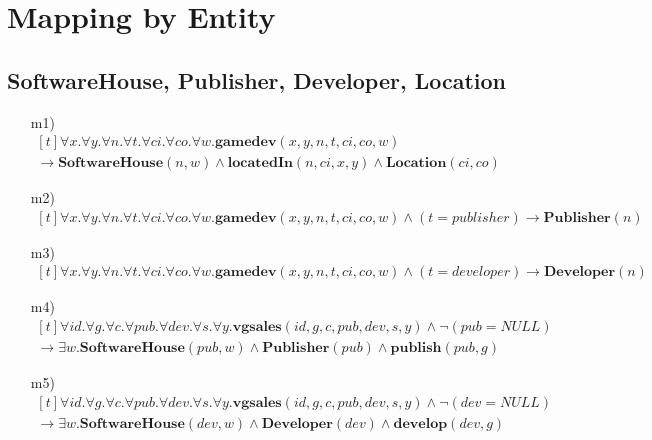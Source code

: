 \section*{Mapping by Entity}

\subsection*{SoftwareHouse, Publisher, Developer, Location}
\begin{itemize}
	\item[m1)] 
	$ \begin{aligned}[t]
	\forall x. \forall y. \forall n. \forall t. \forall ci. \forall co. \forall w.\textbf{gamedev}(x, y, n, t, ci, co, w) \hspace{120pt} \\
	\rightarrow \textbf{SoftwareHouse}(n,w) \wedge \textbf{locatedIn}(n,ci, x, y) \wedge \textbf{Location}(ci,co)
	\end{aligned} $
	\item[m2)]
	$ \begin{aligned}[t]
	\forall x. \forall y. \forall n. \forall t. \forall ci. \forall co. \forall w.\textbf{gamedev}(x, y, n, t, ci, co, w) \wedge (t=publisher) \rightarrow \textbf{Publisher}(n)
	\end{aligned} $
	\item[m3)]
	$ \begin{aligned}[t]
	\forall x. \forall y. \forall n. \forall t. \forall ci. \forall co. \forall w.\textbf{gamedev}(x, y, n, t, ci, co, w) \wedge (t=developer) \rightarrow \textbf{Developer}(n)
	\end{aligned} $
\end{itemize}

\begin{itemize}
	\item[m4)]
	$ \begin{aligned}[t]
	\forall id. \forall g. \forall c. \forall pub. \forall dev. \forall s. \forall y.\textbf{vgsales}(id,g,c,pub,dev,s,y) \wedge \neg(pub=NULL) \\
	\rightarrow \exists
	w.\textbf{SoftwareHouse}(pub,w) \wedge \textbf{Publisher}(pub) \wedge \textbf{publish}(pub,g)
	\end{aligned} $
	\item[m5)]
	$ \begin{aligned}[t]
	\forall id. \forall g. \forall c. \forall pub. \forall dev. \forall s. \forall y.\textbf{vgsales}(id,g,c,pub,dev,s,y) \wedge \neg(dev=NULL) \\
	\rightarrow \exists
	w.\textbf{SoftwareHouse}(dev,w) \wedge \textbf{Developer}(dev) \wedge \textbf{develop}(dev,g)
	\end{aligned} $
\end{itemize}

